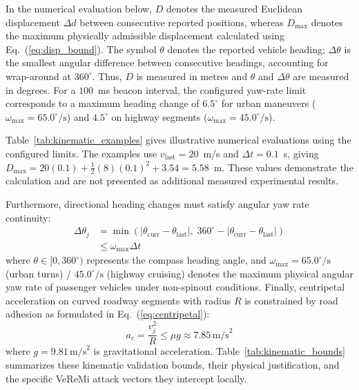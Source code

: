 \documentclass[conference]{IEEEtran}
\begin{document}
In the numerical evaluation below, $D$ denotes the measured Euclidean displacement $\Delta d$ between consecutive reported positions, whereas $D_{\max}$ denotes the maximum physically admissible displacement calculated using Eq.~(\ref{eq:disp_bound}). The symbol $\theta$ denotes the reported vehicle heading; $\Delta\theta$ is the smallest angular difference between consecutive headings, accounting for wrap-around at $360^\circ$. Thus, $D$ is measured in metres and $\theta$ and $\Delta\theta$ are measured in degrees. For a $100$~ms beacon interval, the configured yaw-rate limit corresponds to a maximum heading change of $6.5^\circ$ for urban maneuvers ($\omega_{\text{max}} = 65.0^\circ/\text{s}$) and $4.5^\circ$ on highway segments ($\omega_{\text{max}} = 45.0^\circ/\text{s}$).

Table~\ref{tab:kinematic_examples} gives illustrative numerical evaluations using the configured limits. The examples use $v_{\text{last}}=20$~m/s and $\Delta t=0.1$~s, giving $D_{\max}=20(0.1)+\frac{1}{2}(8)(0.1)^2+3.54=5.58$~m. These values demonstrate the calculation and are not presented as additional measured experimental results.

Furthermore, directional heading changes must satisfy angular yaw rate continuity:
\begin{equation}
\begin{aligned}
\Delta \theta_j &= \min\left(|\theta_{\text{curr}} - \theta_{\text{last}}|, \; 360^\circ - |\theta_{\text{curr}} - \theta_{\text{last}}|\right) \\
&\le \omega_{\text{max}} \Delta t
\end{aligned}
\label{eq:heading_bound}
\end{equation}
where $\theta \in [0, 360^\circ)$ represents the compass heading angle, and $\omega_{\text{max}} = 65.0^\circ/\text{s}$ (urban turns) / $45.0^\circ/\text{s}$ (highway cruising) denotes the maximum physical angular yaw rate of passenger vehicles under non-spinout conditions. Finally, centripetal acceleration on curved roadway segments with radius $R$ is constrained by road adhesion as formulated in Eq.~(\ref{eq:centripetal}):
\begin{equation}
a_c = \frac{v_j^2}{R} \le \mu g \approx 7.85\,\text{m/s}^2
\label{eq:centripetal}
\end{equation}
where $g = 9.81\,\text{m/s}^2$ is gravitational acceleration. Table~\ref{tab:kinematic_bounds} summarizes these kinematic validation bounds, their physical justification, and the specific VeReMi attack vectors they intercept locally.
\end{document}
